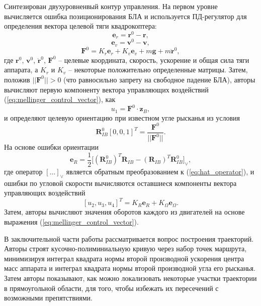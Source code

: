 Синтезирован двухуровненвый контур управления. На первом уровне вычисляется ошибка позиционирования БЛА и используется ПД-регулятор для определения вектора целевой тяги квадрокоптера:
\begin{equation} \label{eq:mellinger_pos_err}
\bm{e}_r = \bm{r}^{0} - \bm{r},
\end{equation}
\begin{equation} \label{eq:mellinger_vel_err}
\bm{e}_v = \bm{v}^{0} - \bm{v},
\end{equation}
\begin{equation} \label{eq:mellinger_pos_reg}
\bm{F}^0 = K_r \bm{e}_r + K_v \bm{e}_v + m \bm{g} + m \ddot{\bm{r}}^0,
\end{equation}
где $\bm{r}^{0}$, $\bm{v}^{0}$, $\ddot{\bm{r}}^{0}$, $\bm{F}^{0}$ -- целевые координата, скорость, ускорение и общая сила тяги аппарата, а $K_r$ и $K_v$ -- некоторые положительно определенные матрицы.
Затем, положив $ || \bm{F}^{0} || > 0$
(что равносильно запрету на свободное падение БЛА),
авторы вычисляют первую компоненту вектора управляющих воздействий (\ref{eq:mellinger_control_vector}),
как
\begin{equation} \label{eq:mellinger_u1}
u_1 = \bm{F}^{0} \cdot \bm{z}_B,
\end{equation}
и определяют целевую ориентацию при известном угле рысканья из условия
\begin{equation} \label{eq:mellinger_Rdes}
\bm{R}_{IB}^0 [0,0,1]^T = \frac{\bm{F}^{0}}{||\bm{F}^{0}||}.
\end{equation}
На основе ошибки ориентации
\begin{equation} \label{eq:mellinger_eR}
\bm{e}_R = \frac{1}{2}
\Big[
(\bm{R}_{IB}^0)^T 	\bm{R}_{IB} -
(\bm{R}_{IB})^T \bm{R}_{IB}^0
\Big]_\vee,
\end{equation}
где оператор $[...]_\vee$ является обратным преобразованием к (\ref{eq:hat_operator}), и ошибки по угловой скорости вычисляются оставшиеся компоненты вектора управляющих воздействий
\begin{equation} \label{eq:mellinger_att_reg}
[u_2, u_3, u_4]^T = K_R \bm{e}_R + K_{\Omega} \bm{e}_{\Omega}.
\end{equation}
Затем, авторы вычисляют значения оборотов каждого из двигателей на основе выражения (\ref{eq:mellinger_control_vector}).
	
В заключительной части работы рассматривается вопрос построения траекторий. Авторы строят кусочно-полиминиальную кривую через набор точек маршрута, минимизируя интеграл квадрата нормы второй производной ускорения центра масс аппарата и интеграл квадрата нормы второй производной угла его рысканья. Затем  авторы показывают, как можно локализовать некоторые участки траектории в прямоугольной области, для того, чтобы избежать их пересечений с возможными препятствиями.

